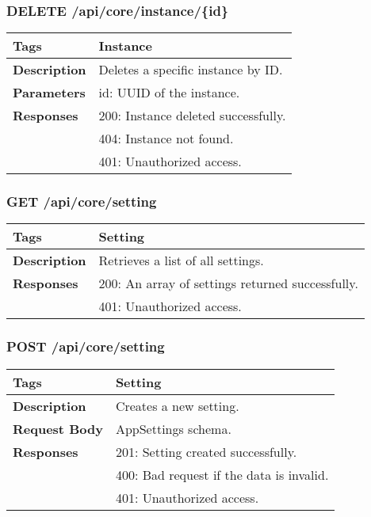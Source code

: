 \subsubsection*{DELETE /api/core/instance/\{id\}}
\begin{longtable}{|>{\raggedright\arraybackslash}p{3cm}|p{10cm}|}
\hline
\textbf{Tags} & Instance \\
\hline
\textbf{Description} & Deletes a specific instance by ID. \\
\hline
\textbf{Parameters} & id: UUID of the instance. \\
\hline
\textbf{Responses} & 200: Instance deleted successfully. \\
 & 404: Instance not found. \\
 & 401: Unauthorized access. \\
\hline
\end{longtable}

\subsubsection*{GET /api/core/setting}
\begin{longtable}{|>{\raggedright\arraybackslash}p{3cm}|p{10cm}|}
\hline
\textbf{Tags} & Setting \\
\hline
\textbf{Description} & Retrieves a list of all settings. \\
\hline
\textbf{Responses} & 200: An array of settings returned successfully. \\
 & 401: Unauthorized access. \\
\hline
\end{longtable}

\subsubsection*{POST /api/core/setting}
\begin{longtable}{|>{\raggedright\arraybackslash}p{3cm}|p{10cm}|}
\hline
\textbf{Tags} & Setting \\
\hline
\textbf{Description} & Creates a new setting. \\
\hline
\textbf{Request Body} & AppSettings schema. \\
\hline
\textbf{Responses} & 201: Setting created successfully. \\
 & 400: Bad request if the data is invalid. \\
 & 401: Unauthorized access. \\
\hline
\end{longtable}

